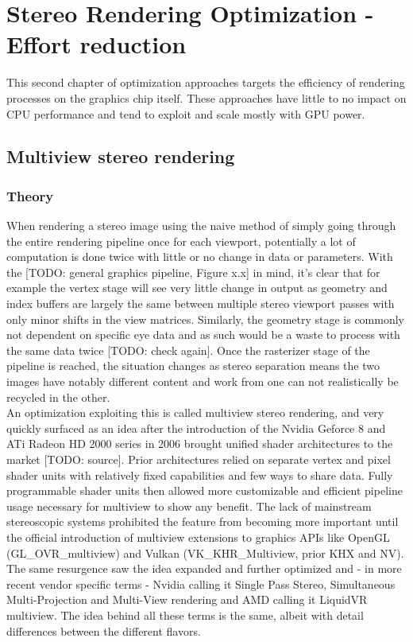 
\chapter{Stereo Rendering Optimization - Effort reduction}
This second chapter of optimization approaches targets the efficiency of rendering processes on the graphics chip itself. These approaches have little to no impact on CPU performance and tend to exploit and scale mostly with GPU power. 

\section{Multiview stereo rendering}
\subsection{Theory}
When rendering a stereo image using the naive method of simply going through the entire rendering pipeline once for each viewport, potentially a lot of computation is done twice with little or no change in data or parameters. 
With the [TODO: general graphics pipeline, Figure x.x] in mind, it's clear that for example the vertex stage will see very little change in output as geometry and index buffers are largely the same between multiple stereo viewport passes with only minor shifts in the view matrices. Similarly, the geometry stage is commonly not dependent on specific eye data and as such would be a waste to process with the same data twice [TODO: check again]. Once the rasterizer stage of the pipeline is reached, the situation changes as stereo separation means the two images have notably different content and work from one can not realistically be recycled in the other. \\

An optimization exploiting this is called multiview stereo rendering, and very quickly surfaced as an idea after the introduction of the Nvidia Geforce 8 and ATi Radeon HD 2000 series in 2006 brought unified shader architectures to the market [TODO: source]. Prior architectures relied on separate vertex and pixel shader units with relatively fixed capabilities and few ways to share data. Fully programmable shader units then allowed more customizable and efficient pipeline usage necessary for multiview to show any benefit. 
The lack of mainstream stereoscopic systems prohibited the feature from becoming more important until the official introduction of multiview extensions to graphics APIs like OpenGL (GL\_OVR\_multiview) and Vulkan (VK\_KHR\_Multiview, prior KHX and NV). 
The same resurgence saw the idea expanded and further optimized and - in more recent vendor specific terms - Nvidia calling it Single Pass Stereo, Simultaneous Multi-Projection and Multi-View rendering and AMD calling it LiquidVR multiview. The idea behind all these terms is the same, albeit with detail differences between the different flavors. \\

